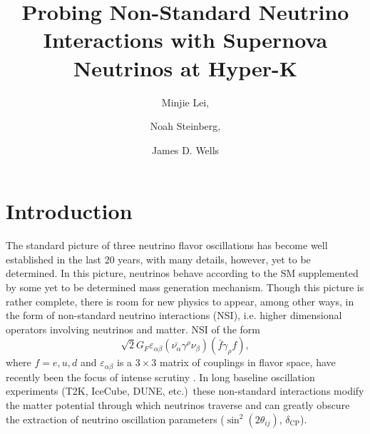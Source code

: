 \documentclass[a4paper,12pt]{article}
\title{Probing Non-Standard Neutrino Interactions with Supernova Neutrinos at Hyper-K}
\author{Minjie Lei,}
\author{Noah Steinberg,}
\author{James D. Wells}
\affiliation{Leinweber Center for Theoretical Physics, Department of Physics, University of Michigan
Ann Arbor, MI 48109 USA}
\begin{document}
\maketitle
\flushbottom

\section{Introduction}
The standard picture of three neutrino flavor oscillations has become well established in the last 20 years, with many details, however, yet to be determined. In this picture, neutrinos behave according to the SM supplemented by some yet to be determined mass generation mechanism. Though this picture is rather complete, there is room for new physics to appear, among other ways, in the form of non-standard neutrino interactions (NSI), i.e. higher dimensional operators involving neutrinos and matter. NSI of the form
\begin{equation} \label{eq:1}
 \sqrt{2}G_{F}\varepsilon_{\alpha\beta}(\bar{\nu_{\alpha}}\gamma^{\rho}\nu_{\beta})(\bar{f}\gamma_{\rho}f),
 \end{equation}
 where $f = e,u,d$ and $\varepsilon_{\alpha\beta}$ is a $3\times3$ matrix of couplings in flavor space, have recently been the focus of intense scrutiny \cite{Rius:2018cjf,Experiments,Altmannshofer:2018xyo,Status}. In long baseline oscillation experiments (T2K, IceCube, DUNE, etc.)\ these non-standard interactions modify the matter potential through which neutrinos traverse and can greatly obscure the extraction of neutrino oscillation parameters ($\sin^2(2\theta_{ij})$, $\delta_{\text{CP}}$).
\end{document}
